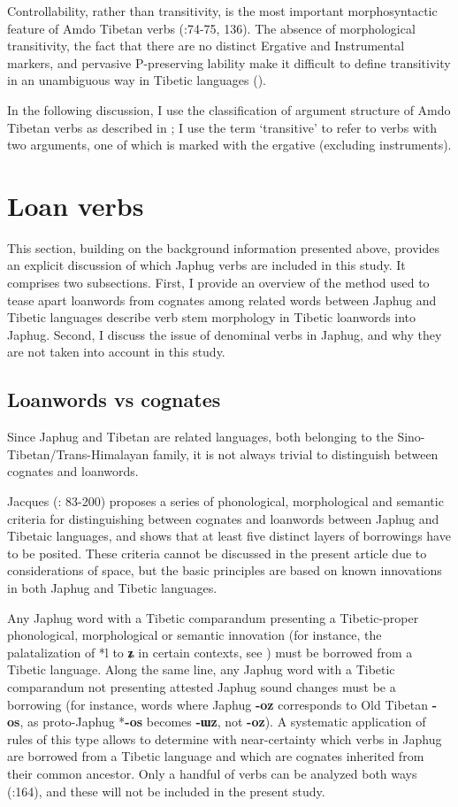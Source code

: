 \documentclass[oneside,a4paper,11pt]{article}
\newcommand{\ipa}[1]{{\phon\textbf{\mbox{#1}}}} %
\begin{document}
Controllability, rather than transitivity, is the most important morphosyntactic feature of Amdo Tibetan verbs (\citealt{haller04themchen}:74-75, 136). The absence of morphological transitivity, the fact that there are no distinct Ergative and Instrumental markers, and pervasive P-preserving lability make it difficult to define transitivity in an unambiguous way in Tibetic languages (\citealt{tournadre96erg}).

In the following discussion, I use the classification of argument structure of Amdo Tibetan verbs as described in \citet{haller04themchen}; I use the term `transitive' to refer to verbs with two arguments, one of which is marked with the ergative (excluding instruments). 


\section{Loan verbs}
This section, building on the background information presented above, provides an explicit discussion of which Japhug verbs are included in this study. It comprises two subsections. First, I provide an overview of the method used to tease apart loanwords from cognates among related words between Japhug and Tibetic languages describe verb stem morphology in Tibetic loanwords into Japhug. Second, I discuss the issue of denominal verbs in Japhug, and why they are not taken into account in this study. 

\subsection{Loanwords vs cognates} \label{sec:layers}
Since Japhug and Tibetan are related languages, both belonging to the Sino-Tibetan/Trans-Himalayan family, it is not always trivial to distinguish between cognates and loanwords. 

Jacques (\citeyear{jacques04these}: 83-200) proposes a series of phonological, morphological and semantic criteria for distinguishing between cognates and  loanwords between Japhug and Tibetaic languages, and shows that at least five distinct layers of borrowings have to be posited. These criteria cannot be discussed in the present article due to considerations of space, but the basic principles are based on known innovations in both Japhug and Tibetic languages. 

Any Japhug word with a Tibetic comparandum presenting a Tibetic-proper phonological, morphological or semantic innovation (for instance, the palatalization of *l to \ipa{ʑ} in certain contexts, see \citealt{hill13laterals}) must be borrowed from a Tibetic language. Along the same line, any Japhug word with a Tibetic comparandum not presenting attested Japhug sound changes must be a borrowing (for instance, words where Japhug \ipa{-oz} corresponds to Old Tibetan \ipa{-os}, as proto-Japhug *\ipa{-os} becomes \ipa{-ɯz}, not \ipa{-oz}). A systematic application of rules of this type allows to determine with near-certainty which verbs in Japhug are borrowed from a Tibetic language and which are cognates inherited from their common ancestor. Only a handful of verbs can be analyzed both ways (\citealt{jacques04these}:164), and these will not be included in the present study. 
\end{document}
